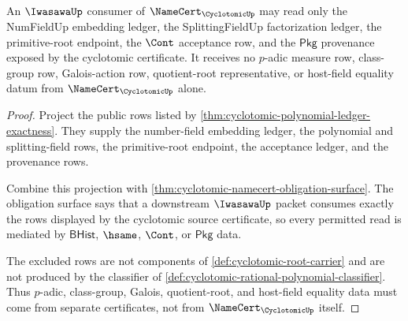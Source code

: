 \begin{theorem}
\label{thm:cyclotomic-iwasawa-consumer-boundary}
An $\IwasawaUp$ consumer of $\NameCert_{\CyclotomicUp}$ may read only the NumFieldUp embedding ledger, the SplittingFieldUp factorization ledger, the primitive-root endpoint, the $\Cont$ acceptance row, and the $\mathsf{Pkg}$ provenance exposed by the cyclotomic certificate. It receives no $p$-adic measure row, class-group row, Galois-action row, quotient-root representative, or host-field equality datum from $\NameCert_{\CyclotomicUp}$ alone.
\end{theorem}
\begin{proof}
Project the public rows listed by \autoref{thm:cyclotomic-polynomial-ledger-exactness}. They supply the number-field embedding ledger, the polynomial and splitting-field rows, the primitive-root endpoint, the acceptance ledger, and the provenance rows.

Combine this projection with \autoref{thm:cyclotomic-namecert-obligation-surface}. The obligation surface says that a downstream $\IwasawaUp$ packet consumes exactly the rows displayed by the cyclotomic source certificate, so every permitted read is mediated by $\mathsf{BHist}$, $\hsame$, $\Cont$, or $\mathsf{Pkg}$ data.

The excluded rows are not components of \autoref{def:cyclotomic-root-carrier} and are not produced by the classifier of \autoref{def:cyclotomic-rational-polynomial-classifier}. Thus $p$-adic, class-group, Galois, quotient-root, and host-field equality data must come from separate certificates, not from $\NameCert_{\CyclotomicUp}$ itself.
\end{proof}

